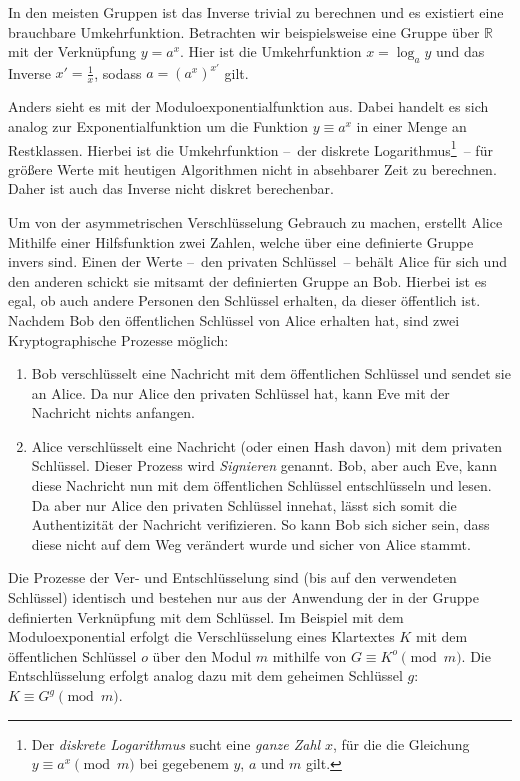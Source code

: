 In den meisten Gruppen ist das Inverse trivial zu berechnen und es existiert eine brauchbare Umkehrfunktion.
Betrachten wir beispielsweise eine Gruppe über $\mathbb{R}$ mit der Verknüpfung $y=a^x$.
Hier ist die Umkehrfunktion $x=\log_a y$ und das Inverse $x'=\frac{1}{x}$, sodass $a=(a^x)^{x'}$ gilt.

Anders sieht es mit der Moduloexponentialfunktion aus.
Dabei handelt es sich analog zur Exponentialfunktion um die Funktion $y \equiv a^x$ in einer Menge an Restklassen.
Hierbei ist die Umkehrfunktion --~der diskrete Logarithmus\footnote{Der \emph{diskrete Logarithmus} sucht eine \emph{ganze Zahl} $x$, für die die Gleichung $y \equiv a^x \pmod{m}$ bei gegebenem $y$, $a$ und $m$ gilt.}~-- für größere Werte mit heutigen Algorithmen nicht in absehbarer Zeit zu berechnen.
Daher ist auch das Inverse nicht diskret berechenbar.

Um von der asymmetrischen Verschlüsselung Gebrauch zu machen, erstellt Alice Mithilfe einer Hilfsfunktion zwei Zahlen, welche über eine definierte Gruppe invers sind.
Einen der Werte --~den privaten Schlüssel~-- behält Alice für sich und den anderen schickt sie mitsamt der definierten Gruppe an Bob.
Hierbei ist es egal, ob auch andere Personen den Schlüssel erhalten, da dieser öffentlich ist.
Nachdem Bob den öffentlichen Schlüssel von Alice erhalten hat, sind zwei Kryptographische Prozesse möglich:
\begin{enumerate}
    \item Bob verschlüsselt eine Nachricht mit dem öffentlichen Schlüssel und sendet sie an Alice.
    Da nur Alice den privaten Schlüssel hat, kann Eve mit der Nachricht nichts anfangen.
    \item Alice verschlüsselt eine Nachricht (oder einen Hash davon) mit dem privaten Schlüssel.
    Dieser Prozess wird \emph{Signieren} genannt.
    Bob, aber auch Eve, kann diese Nachricht nun mit dem öffentlichen Schlüssel entschlüsseln und lesen.
    Da aber nur Alice den privaten Schlüssel innehat, lässt sich somit die Authentizität der Nachricht verifizieren.
    So kann Bob sich sicher sein, dass diese nicht auf dem Weg verändert wurde und sicher von Alice stammt.
\end{enumerate}

Die Prozesse der Ver- und Entschlüsselung sind (bis auf den verwendeten Schlüssel) identisch und bestehen nur aus der Anwendung der in der Gruppe definierten Verknüpfung mit dem Schlüssel.
Im Beispiel mit dem Moduloexponential erfolgt die Verschlüsselung eines Klartextes $K$ mit dem öffentlichen Schlüssel $o$ über den Modul $m$ mithilfe von $G \equiv K^o \pmod{m}$.
Die Entschlüsselung erfolgt analog dazu mit dem geheimen Schlüssel $g$: $K \equiv G^g \pmod{m}$.

